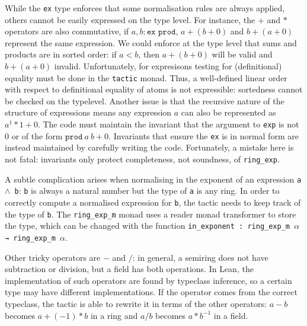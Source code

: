 \documentclass{llncs}
\newcommand{\lean}[1]{\texttt{#1}\xspace} %
\newcommand{\ex}{\lean{ex}}
\newcommand{\pow}{$\wedge$\xspace}
\newcommand{\ringexp}{\lean{ring\_exp}}
\begin{document}
While the \ex type enforces that some normalisation rules are always applied,
others cannot be easily expressed on the type level.
For instance, the $+$ and $*$ operators are also commutative,
if $a, b : \lean{ex prod}$, $a + (b + 0)$ and $b + (a + 0)$ represent the same expression.
We could enforce at the type level that sums and products are in sorted order:
if $a < b$, then $a + (b + 0)$ will be valid and $b + (a + 0)$ invalid. 
Unfortunately, for expresisons testing for (definitional) equality must be done
in the \lean{tactic} monad.
Thus, a well-defined linear order with respect to definitional equality of atoms is not expressible:
sortedness cannot be checked on the typelevel.
Another issue is that the recursive nature of the structure of expressions
means any expression $a$ can also be represented as $a^1*1 + 0$.
The code must maintain the invariant that the argument to \lean{exp} is not $0$ or of the form $\lean{prod}\ a\ b + 0$.
Invariants that ensure the \ex is in normal form are instead maintained by carefully writing the code.
Fortunately, a mistake here is not fatal: invariants only protect completeness, not soundness, of \ringexp.

A subtle complication arises when normalising in the exponent of an expression \lean{a \pow b}:
\lean{b} is always a natural number but the type of \lean{a} is any ring.
In order to correctly compute a normalised expression for \lean{b},
the tactic needs to keep track of the type of \lean{b}.
The \lean{ring\_exp\_m} monad uses a reader monad transformer to store the type,
which can be changed with the function \lean{in\_exponent : ring\_exp\_m $\alpha$ → ring\_exp\_m $\alpha$}.

Other tricky operators are $-$ and $/$:
in general, a semiring does not have subtraction or division,
but a field has both operations.
In Lean, the implementation of such operators are found by typeclass inference,
so a certain type may have different implementations.
If the operator comes from the correct typeclass,
the tactic is able to rewrite it in terms of the other operators:
$a - b$ becomes $a + (-1) * b$ in a ring
and $a / b$ becomes $a * b^{-1}$ in a field.
\end{document}
